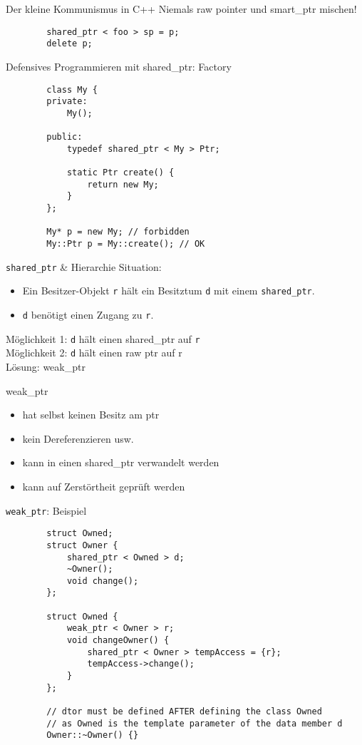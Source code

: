 \begin{frame}[fragile]{Der kleine Kommunismus in C++}
	Niemals raw pointer und smart\_ptr mischen!
	
	\begin{lstlisting}
		shared_ptr < foo > sp = p;
		delete p;
	\end{lstlisting}
	
	\pause
	
	Defensives Programmieren mit shared\_ptr: Factory
	
	\begin{lstlisting}
		class My {
		private:
		    My();
			
		public:
		    typedef shared_ptr < My > Ptr;
			
		    static Ptr create() {
		        return new My;
		    }
		};
		
		My* p = new My; // forbidden
		My::Ptr p = My::create(); // OK
	\end{lstlisting}
\end{frame}

\begin{frame}{ \texttt{shared\_ptr} \& Hierarchie }
	Situation:
	\begin{itemize}
		\item Ein Besitzer-Objekt \texttt{r} hält ein Besitztum \texttt{d} mit einem \texttt{shared\_ptr}.
		\item \texttt{d} benötigt einen Zugang zu \texttt{r}.
	\end{itemize}
	
	\pause
	Möglichkeit 1: \texttt{d} hält einen shared\_ptr auf \texttt{r}\\
	\pause
	Möglichkeit 2: \texttt{d} hält einen raw ptr auf \texttt{}r\\
	\pause
	Lösung: weak\_ptr
	
	\begin{block}{weak\_ptr}
		\begin{itemize}
			\item hat selbst keinen Besitz am ptr
			\item kein Dereferenzieren usw.
			\item kann in einen shared\_ptr verwandelt werden
			\item kann auf Zerstörtheit geprüft werden
		\end{itemize}
	\end{block}
\end{frame}

\begin{frame}[fragile]{ \texttt{weak\_ptr}: Beispiel }
	\begin{lstlisting}
		struct Owned;
		struct Owner {
		    shared_ptr < Owned > d;
		    ~Owner();
		    void change();
		};
		
		struct Owned {
		    weak_ptr < Owner > r;
		    void changeOwner() {
		        shared_ptr < Owner > tempAccess = {r};
		        tempAccess->change();
		    }
		};
		
		// dtor must be defined AFTER defining the class Owned
		// as Owned is the template parameter of the data member d
		Owner::~Owner() {}
	\end{lstlisting}
\end{frame}
